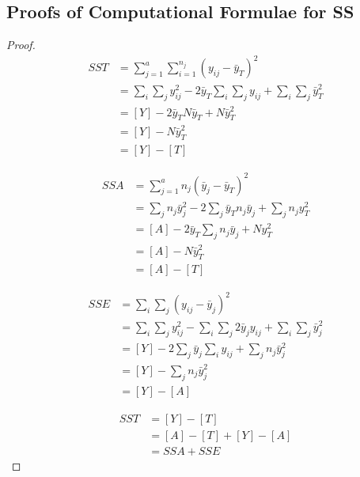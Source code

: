 \documentclass[a4paper,11pt]{article}
\begin{document}
\subsection{Proofs of Computational Formulae for SS}
\begin{proof}

\begin{align*}
SST&=\sum_{j=1}^a\sum_{i=1}^{n_j}(y_{ij}-\bar{y}_T)^2\\
&=\sum_i\sum_jy_{ij}^2-2\bar{y}_T\sum_i\sum_jy_{ij}+\sum_i\sum_j\bar{y}_T^2\\
&=[Y]-2\bar{y}_TN\bar{y}_T+N\bar{y}_T^2\\
&=[Y]-N\bar{y}_T^2\\
&=[Y]-[T]
\end{align*}

\begin{align*}
SSA&=\sum_{j=1}^an_j(\bar{y}_j-\bar{y}_T)^2\\
&=\sum_jn_j\bar{y}_j^2-2\sum_j\bar{y}_Tn_j\bar{y}_j+\sum_jn_jy_T^2\\
&=[A]-2\bar{y}_T\sum_jn_j\bar{y}_j+Ny_T^2\\
&=[A]-N\bar{y}_T^2\\
&=[A]-[T]
\end{align*}

\begin{align*}
SSE&=\sum_i\sum_j(y_{ij}-\bar{y}_j)^2\\
&=\sum_i\sum_jy_{ij}^2-\sum_i\sum_j2\bar{y}_jy_{ij}+\sum_i\sum_j\bar{y}_j^2\\
&=[Y]-2\sum_j\bar{y}_j\sum_iy_{ij}+\sum_jn_j\bar{y}_j^2\\
&=[Y]-\sum_jn_j\bar{y}_j^2\\
&=[Y]-[A]
\end{align*}

\begin{align*}
SST&=[Y]-[T]\\
&=[A]-[T]+[Y]-[A]\\
&=SSA+SSE
\end{align*}

\end{proof}
\newpage
\end{document}
